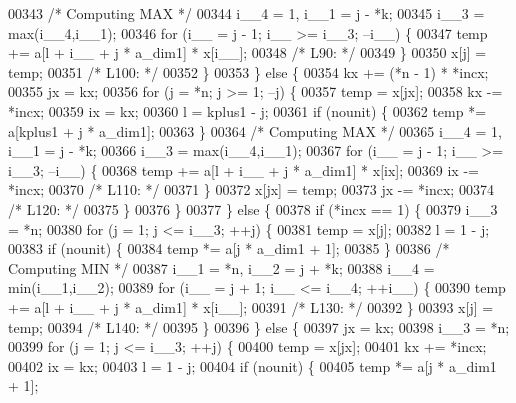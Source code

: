 \begin{DoxyCode}
00343 \textcolor{comment}{/* Computing MAX */}
00344             i\_\_4 = 1, i\_\_1 = j - *k;
00345             i\_\_3 = max(i\_\_4,i\_\_1);
00346             \textcolor{keywordflow}{for} (i\_\_ = j - 1; i\_\_ >= i\_\_3; --i\_\_) \{
00347             temp += a[l + i\_\_ + j * a\_dim1] * x[i\_\_];
00348 \textcolor{comment}{/* L90: */}
00349             \}
00350             x[j] = temp;
00351 \textcolor{comment}{/* L100: */}
00352         \}
00353         \} \textcolor{keywordflow}{else} \{
00354         kx += (*n - 1) * *incx;
00355         jx = kx;
00356         \textcolor{keywordflow}{for} (j = *n; j >= 1; --j) \{
00357             temp = x[jx];
00358             kx -= *incx;
00359             ix = kx;
00360             l = kplus1 - j;
00361             \textcolor{keywordflow}{if} (nounit) \{
00362             temp *= a[kplus1 + j * a\_dim1];
00363             \}
00364 \textcolor{comment}{/* Computing MAX */}
00365             i\_\_4 = 1, i\_\_1 = j - *k;
00366             i\_\_3 = max(i\_\_4,i\_\_1);
00367             \textcolor{keywordflow}{for} (i\_\_ = j - 1; i\_\_ >= i\_\_3; --i\_\_) \{
00368             temp += a[l + i\_\_ + j * a\_dim1] * x[ix];
00369             ix -= *incx;
00370 \textcolor{comment}{/* L110: */}
00371             \}
00372             x[jx] = temp;
00373             jx -= *incx;
00374 \textcolor{comment}{/* L120: */}
00375         \}
00376         \}
00377     \} \textcolor{keywordflow}{else} \{
00378         \textcolor{keywordflow}{if} (*incx == 1) \{
00379         i\_\_3 = *n;
00380         \textcolor{keywordflow}{for} (j = 1; j <= i\_\_3; ++j) \{
00381             temp = x[j];
00382             l = 1 - j;
00383             \textcolor{keywordflow}{if} (nounit) \{
00384             temp *= a[j * a\_dim1 + 1];
00385             \}
00386 \textcolor{comment}{/* Computing MIN */}
00387             i\_\_1 = *n, i\_\_2 = j + *k;
00388             i\_\_4 = min(i\_\_1,i\_\_2);
00389             \textcolor{keywordflow}{for} (i\_\_ = j + 1; i\_\_ <= i\_\_4; ++i\_\_) \{
00390             temp += a[l + i\_\_ + j * a\_dim1] * x[i\_\_];
00391 \textcolor{comment}{/* L130: */}
00392             \}
00393             x[j] = temp;
00394 \textcolor{comment}{/* L140: */}
00395         \}
00396         \} \textcolor{keywordflow}{else} \{
00397         jx = kx;
00398         i\_\_3 = *n;
00399         \textcolor{keywordflow}{for} (j = 1; j <= i\_\_3; ++j) \{
00400             temp = x[jx];
00401             kx += *incx;
00402             ix = kx;
00403             l = 1 - j;
00404             \textcolor{keywordflow}{if} (nounit) \{
00405             temp *= a[j * a\_dim1 + 1];

\end{DoxyCode}

